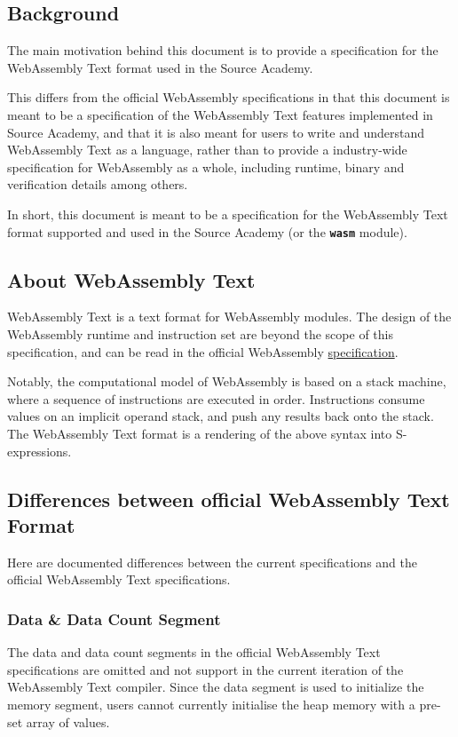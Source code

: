 \subsection{Background}

The main motivation behind this document is to provide a specification for the WebAssembly Text
format used in the Source Academy. \vspace{1em}

This differs from the official WebAssembly specifications
in that this document is meant to be a specification of the WebAssembly Text features implemented
in Source Academy, and that it is also meant for users to write and understand WebAssembly Text as
a language, rather than to provide a industry-wide specification for WebAssembly as a whole,
including runtime, binary and verification details among others.  \vspace{1em}

In short, this document is meant to be a specification for the WebAssembly Text format supported and used
in the Source Academy (or the \textbf{\texttt{wasm}} module).

\subsection{About WebAssembly Text}
WebAssembly Text is a text format for WebAssembly modules. The design of the 
WebAssembly runtime and instruction set are beyond the scope of this specification, 
and can be read in the official WebAssembly 
\href{https://webassembly.github.io/spec/core/_download/WebAssembly.pdf}{specification}. \vspace{1em}

Notably, the computational model of WebAssembly is based on a stack machine, 
where a sequence of instructions are executed in order. Instructions consume 
values on an implicit operand stack, and push any results back onto the stack.
The WebAssembly Text format is a rendering of the above syntax into S-expressions.

\subsection{Differences between official WebAssembly Text Format}

Here are documented differences between the current specifications and the official WebAssembly Text specifications.

\subsubsection{Data \& Data Count Segment}

The data and data count segments in the official WebAssembly Text specifications are omitted and not support in the current iteration of the WebAssembly Text compiler.
Since the data segment is used to initialize the memory segment, users cannot currently initialise the heap memory with a pre-set array of values.